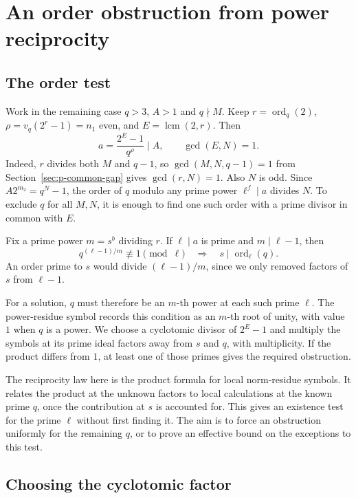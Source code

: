 \documentclass[11pt]{article}
\begin{document}
\section{An order obstruction from power reciprocity}
\label{sec:reciprocity}

\subsection{The order test}

Work in the remaining case $q>3$, $A>1$ and $q\nmid M$. Keep
$r=\operatorname{ord}_q(2)$, $\rho=v_q(2^r-1)=n_1$ even, and
$E=\operatorname{lcm}(2,r)$. Then
\[
a=\frac{2^E-1}{q^\rho}\mid A,\qquad \gcd(E,N)=1.
\]
Indeed, $r$ divides both $M$ and $q-1$, so
$\gcd(M,N,q-1)=1$ from Section~\ref{sec:p-common-gap} gives
$\gcd(r,N)=1$. Also $N$ is odd.
Since $A2^{m_2}=q^N-1$, the order of $q$ modulo any prime power
$\ell^f\mid a$ divides $N$. To exclude $q$ for all $M,N$, it is enough
to find one such order with a prime divisor in common with $E$.

Fix a prime power $m=s^b$ dividing $r$. If $\ell\mid a$ is prime and
$m\mid\ell-1$, then
\[
q^{(\ell-1)/m}\not\equiv1\pmod\ell
\quad\Longrightarrow\quad s\mid\operatorname{ord}_{\ell}(q).
\]
An order prime to $s$ would divide $(\ell-1)/m$, since we only
removed factors of $s$ from $\ell-1$.

For a solution, $q$ must therefore be an $m$-th power at each such
prime $\ell$. The power-residue symbol records this condition as an
$m$-th root of unity, with value $1$ when $q$ is a power. We choose a
cyclotomic divisor of $2^E-1$ and multiply the symbols at its prime
ideal factors away from $s$ and $q$, with multiplicity. If the
product differs from $1$, at least one of those primes gives the
required obstruction.

The reciprocity law here is the product formula for local
norm-residue symbols. It relates the product at the unknown factors
to local calculations at the known prime $q$, once the contribution
at $s$ is accounted for. This gives an existence test for the prime
$\ell$ without first finding it. The aim is to force an obstruction
uniformly for the remaining $q$, or to prove an effective bound on
the exceptions to this test.

\subsection{Choosing the cyclotomic factor}
\end{document}
